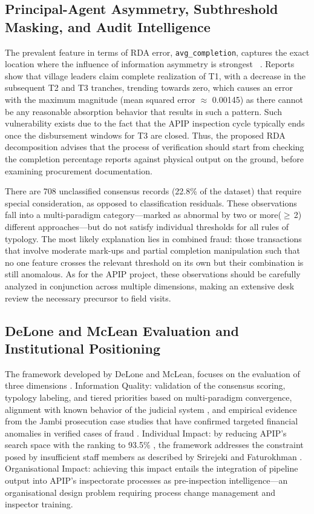 \documentclass[3p,times,procedia]{elsarticle}
\begin{document}
\subsection{Principal-Agent Asymmetry, Subthreshold Masking, and Audit Intelligence}

The prevalent feature in terms of RDA error, \texttt{avg\_completion}, captures the exact location where the influence of information asymmetry is strongest ~\cite{ref23}. Reports show that village leaders claim complete realization of T1, with a decrease in the subsequent T2 and T3 tranches, trending towards zero, which causes an error with the maximum magnitude (mean squared error $\approx$ 0.00145) as there cannot be any reasonable absorption behavior that results in such a pattern. Such vulnerability exists due to the fact that the APIP inspection cycle typically ends once the disbursement windows for T3 are closed. Thus, the proposed RDA decomposition advises that the process of verification should start from checking the completion percentage reports against physical output on the ground, before examining procurement documentation.

There are 708 unclassified consensus records (22.8\% of the dataset) that require special consideration, as opposed to classification residuals. These observations fall into a multi-paradigm category—marked as abnormal by two or more($\geq$\,2) different approaches—but do not satisfy individual thresholds for all rules of typology. The most likely explanation lies in combined fraud: those transactions that involve moderate mark-ups and partial completion manipulation such that no one feature crosses the relevant threshold on its own but their combination is still anomalous. As for the APIP project, these observations should be carefully analyzed in conjunction across multiple dimensions, making an extensive desk review the necessary precursor to field visits.

\subsection{DeLone and McLean Evaluation and Institutional Positioning}

The framework developed by DeLone and McLean, focuses on the evaluation of three dimensions \cite{ref31}. Information Quality: validation of the consensus scoring, typology labeling, and tiered priorities based on multi-paradigm convergence, alignment with known behavior of the judicial system \cite{ref13,ref14}, and empirical evidence from the Jambi prosecution case studies that have confirmed targeted financial anomalies in verified cases of fraud \cite{ref15,ref16,ref17,ref18}. Individual Impact: by reducing APIP’s search space with the ranking to 93.5\% \cite{ref25}, the framework addresses the constraint posed by insufficient staff members as described by Srirejeki and Faturokhman \cite{ref29}. Organisational Impact: achieving this impact entails the integration of pipeline output into APIP’s inspectorate processes as pre-inspection intelligence—an organisational design problem requiring process change management and inspector training.
\end{document}

